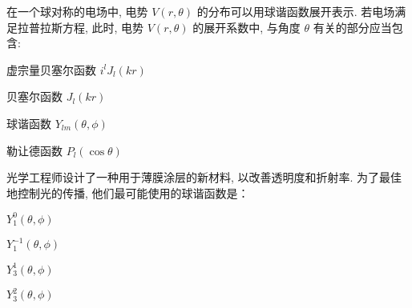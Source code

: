 \documentclass{njustexam}
\begin{document}
\begin{problem}
  在一个球对称的电场中, 电势 $V(r,  \theta)$ 的分布可以用球谐函数展开表示. 
  若电场满足拉普拉斯方程, 
  此时, 电势 $V(r,  \theta)$ 的展开系数中, 与角度 $\theta$ 有关的部分应当包含: 
  \begin{abcd}
  \item 虚宗量贝塞尔函数 $i^l J_l(kr)$
  \item 贝塞尔函数 $J_l(kr)$
  \item 球谐函数 $Y_{lm}(\theta,  \phi)$
  \item 勒让德函数 $P_l(\cos\theta)$

  \end{abcd}
\end{problem}



  
  
  

  \begin{problem}
    光学工程师设计了一种用于薄膜涂层的新材料, 以改善透明度和折射率. 为了最佳地控制光的传播, 他们最可能使用的球谐函数是：
    \begin{abcd}

    \item $Y_{1}^0(\theta,  \phi)$
    
    \item $Y_{1}^{-1}(\theta,  \phi)$
    
    \item $Y_{3}^1(\theta,  \phi)$
    
    \item $Y_{3}^2(\theta,  \phi)$
   \end{abcd}

  \end{problem}
\end{document}
